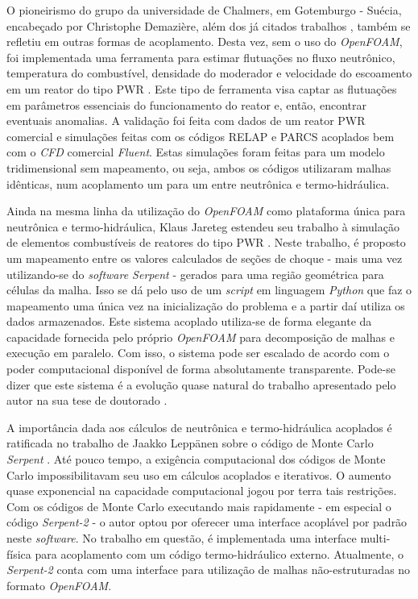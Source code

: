 O pioneirismo do grupo da universidade de Chalmers, em Gotemburgo - Suécia, encabeçado
por Christophe Demazière, além dos já citados trabalhos \cite{Jareteg2012, Jareteg2014},
também se refletiu em outras formas de acoplamento. Desta vez, sem o uso do \textit{OpenFOAM},
foi implementada uma ferramenta para estimar flutuações no fluxo neutrônico, temperatura
do combustível, densidade do moderador e velocidade do escoamento em um reator do tipo PWR
\cite{Larsson2012}. Este tipo de ferramenta visa captar as flutuações em parâmetros
essenciais do funcionamento do reator e, então, encontrar eventuais anomalias. A validação
foi feita com dados de um reator PWR comercial e simulações feitas com os códigos
RELAP e PARCS acoplados bem com o \textit{CFD} comercial \textit{Fluent}. Estas simulações
foram feitas para um modelo tridimensional sem mapeamento, ou seja, ambos os códigos
utilizaram malhas idênticas, num acoplamento um para um entre neutrônica e termo-hidráulica.

Ainda na mesma linha da utilização do \textit{OpenFOAM} como plataforma única para neutrônica e
termo-hidráulica, Klaus Jareteg estendeu seu trabalho à simulação de elementos combustíveis de
reatores do tipo PWR \cite{Jareteg2015}. Neste trabalho, é proposto um mapeamento entre os valores
calculados de seções de choque - mais uma vez utilizando-se do \textit{software Serpent} - gerados
para uma região geométrica para células da malha. Isso se dá pelo uso de um \textit{script} em
linguagem \textit{Python} que faz o mapeamento uma única vez na inicialização do problema e
a partir daí utiliza os dados armazenados. Este sistema acoplado utiliza-se de forma elegante da
capacidade fornecida pelo próprio \textit{OpenFOAM} para decomposição de malhas e execução em paralelo.
Com isso, o sistema pode ser escalado de acordo com o poder computacional disponível de forma
absolutamente transparente. Pode-se dizer que este sistema é a evolução quase natural do trabalho
apresentado pelo autor na sua tese de doutorado \cite{Jareteg2012}.



A importância dada aos cálculos de neutrônica e termo-hidráulica acoplados
é ratificada no trabalho de Jaakko Leppänen sobre o código de Monte Carlo
\textit{Serpent} \cite{Leppanen2012}. Até pouco tempo, a exigência computacional dos códigos
de Monte Carlo impossibilitavam seu uso em cálculos acoplados e iterativos. O aumento
quase exponencial na capacidade computacional jogou por terra tais restrições.
Com os códigos de Monte Carlo executando mais rapidamente - em especial o código \textit{Serpent-2} -
o autor optou por oferecer uma interface acoplável por padrão neste \textit{software}.
No trabalho em questão, é implementada uma interface multi-física para acoplamento com um
código termo-hidráulico externo. Atualmente, o \textit{Serpent-2} conta com uma interface para utilização
de malhas não-estruturadas no formato \textit{OpenFOAM}.

